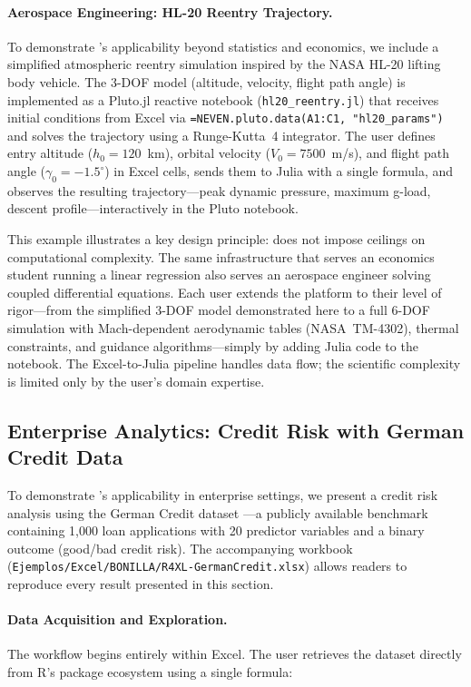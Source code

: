 \paragraph{Aerospace Engineering: HL-20 Reentry Trajectory.}
To demonstrate \neven{}'s applicability beyond statistics and economics, we include a simplified atmospheric reentry simulation inspired by the NASA HL-20 lifting body vehicle. The 3-DOF model (altitude, velocity, flight path angle) is implemented as a Pluto.jl reactive notebook (\texttt{hl20\_reentry.jl}) that receives initial conditions from Excel via \texttt{=NEVEN.pluto.data(A1:C1, "hl20\_params")} and solves the trajectory using a Runge-Kutta~4 integrator. The user defines entry altitude ($h_0 = 120$~km), orbital velocity ($V_0 = 7500$~m/s), and flight path angle ($\gamma_0 = -1.5^\circ$) in Excel cells, sends them to Julia with a single formula, and observes the resulting trajectory---peak dynamic pressure, maximum g-load, descent profile---interactively in the Pluto notebook.

This example illustrates a key design principle: \neven{} does not impose ceilings on computational complexity. The same infrastructure that serves an economics student running a linear regression also serves an aerospace engineer solving coupled differential equations. Each user extends the platform to their level of rigor---from the simplified 3-DOF model demonstrated here to a full 6-DOF simulation with Mach-dependent aerodynamic tables (NASA~TM-4302), thermal constraints, and guidance algorithms---simply by adding Julia code to the notebook. The Excel-to-Julia pipeline handles data flow; the scientific complexity is limited only by the user's domain expertise.

\subsection{Enterprise Analytics: Credit Risk with German Credit Data}
\label{subsec:enterprise}

To demonstrate \neven{}'s applicability in enterprise settings, we present a credit risk analysis using the German Credit dataset \citep{Dua2019}---a publicly available benchmark containing 1,000 loan applications with 20 predictor variables and a binary outcome (good/bad credit risk). The accompanying workbook (\texttt{Ejemplos/Excel/BONILLA/R4XL-GermanCredit.xlsx}) allows readers to reproduce every result presented in this section.

\paragraph{Data Acquisition and Exploration.}
The workflow begins entirely within Excel. The user retrieves the dataset directly from R's package ecosystem using a single formula:

